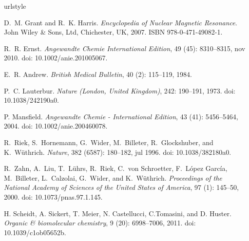\documentclass[aip,rsi,reprint,graphicx]{revtex4-1} %
\begin{document}
\begin{thebibliography}{57}
\providecommand{\natexlab}[1]{#1}
\providecommand{\url}[1]{\texttt{#1}}
\expandafter\ifx\csname urlstyle\endcsname\relax
  \providecommand{\doi}[1]{doi: #1}\else
  \providecommand{\doi}{doi: \begingroup \urlstyle{rm}\Url}\fi

D.~M. Grant and R.~K. Harris.
\newblock \emph{{Encyclopedia of Nuclear Magnetic Resonance}}.
\newblock John Wiley {\&} Sons, Ltd, Chichester, UK, 2007.
\newblock ISBN 978-0-471-49082-1.

R.~R. Ernst.
\newblock \emph{Angewandte Chemie International Edition}, 49
  (45): 8310--8315, nov 2010.
\newblock \doi{10.1002/anie.201005067}.

E.~R. Andrew.
\newblock \emph{British Medical Bulletin}, 40 (2): 115--119,
  1984.

P.~C. Lauterbur.
\newblock \emph{Nature (London, United Kingdom)}, 242: 190--191, 1973.
\newblock \doi{10.1038/242190a0}.

P. Mansfield.
\newblock \emph{Angewandte Chemie - International Edition}, 43
  (41): 5456--5464, 2004.
\newblock \doi{10.1002/anie.200460078}.

R.~Riek, S.~Hornemann, G.~Wider, M.~Billeter, R.~Glockshuber, and
  K.~W{\"{u}}thrich.
\newblock \emph{Nature}, 382 (6587): 180--182, jul 1996.
\newblock \doi{10.1038/382180a0}.

R.~Zahn, A.~Liu, T.~L{\"{u}}hrs, R.~Riek, C.~von Schroetter, F.~{L{\'{o}}pez
  Garc{\'{i}}a}, M.~Billeter, L.~Calzolai, G.~Wider, and K.~W{\"{u}}thrich.
\newblock \emph{Proceedings of the National Academy of Sciences of the United
  States of America}, 97 (1): 145--50, 2000.
\newblock \doi{10.1073/pnas.97.1.145}.

H. Scheidt, A. Sickert, T. Meier, N. Castellucci, C.Tomasini, and D. Huster.
\newblock \emph{Organic {\&} biomolecular chemistry}, 9 (20):
  6998--7006, 2011.
\newblock \doi{10.1039/c1ob05652b}.


\end{thebibliography}
\end{document}
